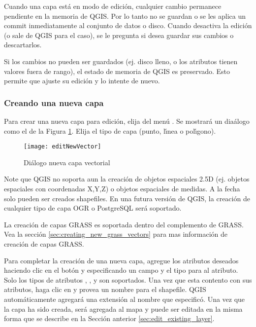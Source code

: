 Cuando una capa est\'a en modo de edici\'on, cualquier cambio permanece pendiente en la memoria de QGIS.
Por lo tanto no se guardan o se les aplica un commit inmediatamente al conjunto de datos o disco.
Cuando desactiva la edici\'on (o sale de QGIS para el caso), 
se le pregunta si desea guardar sus cambios o
descartarlos.

Si los cambios no pueden ser guardados (ej. disco lleno, o los atributos tienen
valores fuera de rango), el estado de memoria de QGIS es preservado.  Esto
permite que ajuste su edici\'on y lo intente de nuevo.

\subsubsection{Creando una nueva capa}\label{sec:create shape}

Para crear una nueva capa para edici\'on, elija  del
 men\'u . 
Se mostrar\'a un dia\'alogo  como el de la
Figura \ref{fig:newvectorlayer}. Elija el tipo de capa (punto,
l\'{\i}nea o pol\'{\i}gono).

\begin{figure}[ht]
   \begin{center}
   \caption{Di\'alogo nueva capa vectorial \nixcaption}\label{fig:newvectorlayer}\smallskip
   \texttt{[image: editNewVector]}
\end{center} 
\end{figure}

Note que QGIS no soporta aun la creaci\'on de
objetos espaciales 2.5D (ej. objetos espaciales con coordenadas X,Y,Z) o objetos espaciales de medidas.
A la fecha solo pueden ser creados shapefiles. En una futura versi\'on de QGIS, la creaci\'on de cualquier tipo
de capa OGR o PostgreSQL ser\'a soportado. 

La creaci\'on de capas GRASS es soportada dentro del complemento de GRASS. Vea la secci\'on 
\ref{sec:creating_new_grass_vectors} para mas informaci\'on de creaci\'on de capas GRASS.

Para completar la creaci\'on de una nueva capa, agregue los atributos deseados haciendo
clic en el bot\'on   y especificando un campo y el tipo para al atributo.
Solo los tipos de atributos , , y  son soportados. Una vez que esta contento con sus atributos,
haga clic en  y provea un nombre para el shapefile.
QGIS autom\'aticamente agregar\'a una extensi\'on  al nombre que especific\'o. Una vez
que la capa ha sido creada, ser\'a agregada al mapa y puede ser editada en la misma forma
que se describe en la Secci\'on anterior \ref{sec:edit_existing_layer}. 

